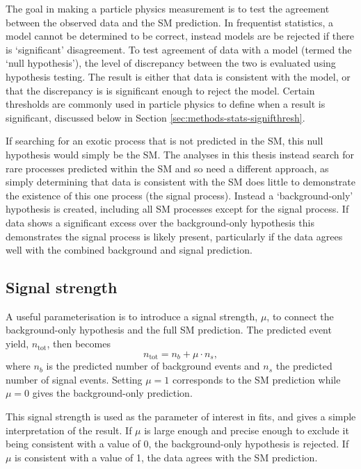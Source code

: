 
The goal in making a particle physics measurement is to test the agreement
between the observed data and the \ac{SM} prediction. In frequentist statistics,
a model cannot be determined to be correct, instead models are be rejected if
there is `significant' disagreement. To test agreement of data with a model
(termed the `null hypothesis'), the level of discrepancy between the two is
evaluated using hypothesis testing.  The result is either that data is
consistent with the model, or that the discrepancy is is significant enough to
reject the model.
Certain thresholds are commonly used in particle physics to define when a result
is significant, discussed below in Section
\ref{sec:methods-stats-signifthresh}.

If searching for an exotic process that is not predicted in the \ac{SM}, this
null hypothesis would simply be the \ac{SM}. The analyses in this thesis instead
search for rare processes predicted within the \ac{SM} and so need a different
approach, as simply determining that data is consistent with the \ac{SM} does
little to demonstrate the existence of this one process (the signal process).
Instead a `background-only' hypothesis is created, including all \ac{SM}
processes except for the signal process. If data shows a significant excess over
the background-only hypothesis this demonstrates the signal process is likely
present, particularly if the data agrees well with the combined background and
signal prediction.

\subsection{Signal strength}

A useful parameterisation is to introduce a signal strength, $\mu$, to connect
the background-only hypothesis and the full \ac{SM} prediction. The predicted
event yield, $n_\text{tot}$, then becomes
\begin{equation*}
  n_\text{tot} = n_b + \mu\cdot n_s,
\end{equation*}
where $n_b$ is the predicted number of background events and $n_s$ the predicted number of signal
events. Setting $\mu=1$ corresponds to the \ac{SM} prediction while $\mu=0$
gives the background-only prediction.

This signal strength is used as the parameter of interest in fits, and gives a
simple interpretation of the result. If $\mu$ is large enough and precise enough
to exclude it being consistent with a value of 0, the background-only hypothesis is
rejected. If $\mu$ is consistent with a value of 1, the data agrees with the
\ac{SM} prediction.

